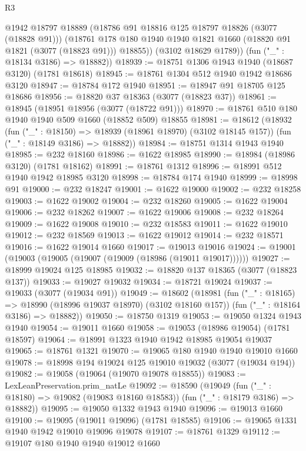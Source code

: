 \begin{lexlean}{R3}
\begin{coremodule}
          @1942
          @18797
          @18889
          (@18786 @91 @18816 @125 @18797 @18826 (@3077 (@18828 @91)))
          (@18761 @178 @180 @1940 @1940 @1821 @1660 (@18820 @91 @1821 (@3077 (@18823 @91))) @18855))
        (@3102 @18629 @1789))
      (fun ("_" : @18134 @3186) => @18882))
@18939 := @18751 @1306 @1943 @1940 (@18687 @3120) (@1781 @18618)
@18945 := @18761 @1304 @512 @1940 @1942 @18686 @3120
@18947 := @18784 @172 @1940
@18951 := @18947 @91 @18705 @125 @18686
@18956 := @18820 @37 @18363 (@3077 (@18823 @37))
@18961 := @18945 (@18951 @18956 (@3077 (@18722 @91)))
@18970 := @18761 @510 @180 @1940 @1940 @509 @1660 (@18852 @509) @18855
@18981 := @18612
    (@18932
      (fun ("_" : @18150) => @18939 (@18961 @18970) (@3102 @18145 @157))
      (fun ("_" : @18149 @3186) => @18882))
@18984 := @18751 @1314 @1943 @1940
@18985 := @232 @18160
@18986 := @1622 @18985
@18990 := @18984 (@18986 @3120) (@1781 @18162)
@18991 := @18761 @1312
@18996 := @18991 @512 @1940 @1942 @18985 @3120
@18998 := @18784 @174 @1940
@18999 := @18998 @91
@19000 := @232 @18247
@19001 := @1622 @19000
@19002 := @232 @18258
@19003 := @1622 @19002
@19004 := @232 @18260
@19005 := @1622 @19004
@19006 := @232 @18262
@19007 := @1622 @19006
@19008 := @232 @18264
@19009 := @1622 @19008
@19010 := @232 @18583
@19011 := @1622 @19010
@19012 := @232 @18569
@19013 := @1622 @19012
@19014 := @232 @18571
@19016 := @1622 @19014 @1660
@19017 := @19013 @19016
@19024 := @19001 (@19003 (@19005 (@19007 (@19009 (@18986 (@19011 @19017))))))
@19027 := @18999 @19024 @125 @18985
@19032 := @18820 @137 @18365 (@3077 (@18823 @137))
@19033 := @19027 @19032
@19034 := @18721 @19024
@19037 := @19033 (@3077 (@19034 @91))
@19049 := @18602
    (@18981
      (fun ("_" : @18165) => @18990 (@18996 @19037 @18970) (@3102 @18160 @157))
      (fun ("_" : @18164 @3186) => @18882))
@19050 := @18750 @1319
@19053 := @19050 @1324 @1943 @1940
@19054 := @19011 @1660
@19058 := @19053 (@18986 @19054) (@1781 @18597)
@19064 := @18991 @1323 @1940 @1942 @18985 @19054 @19037
@19065 := @18761 @1321
@19070 := @19065 @180 @1940 @1940 @19010 @1660
@19078 := @18998 @194 @19024 @125 @19010 @19032 (@3077 (@19034 @194))
@19082 := @19058 (@19064 (@19070 @19078 @18855))
@19083 := LexLeanPreservation.prim_natLe
@19092 := @18590
    (@19049
      (fun ("_" : @18180) => @19082 (@19083 @18160 @18583))
      (fun ("_" : @18179 @3186) => @18882))
@19095 := @19050 @1332 @1943 @1940
@19096 := @19013 @1660
@19100 := @19095 (@19011 @19096) (@1781 @18585)
@19106 := @19065 @1331 @1940 @1942 @19010 @19096 @19078
@19107 := @18761 @1329
@19112 := @19107 @180 @1940 @1940 @19012 @1660

\end{coremodule}
\end{lexlean}
